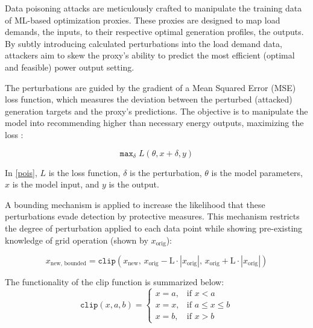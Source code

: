 Data poisoning attacks are meticulously crafted to manipulate the training data of ML-based optimization proxies. These proxies are designed to map load demands, the inputs, to their respective optimal generation profiles, the outputs. By subtly introducing calculated perturbations into the load demand data, attackers aim to skew the proxy's ability to predict the most efficient (optimal and feasible) power output setting.

The perturbations are guided by the gradient of a Mean Squared Error (MSE) loss function, which measures the deviation between the perturbed (attacked) generation targets and the proxy's predictions. The objective is to manipulate the model into recommending higher than necessary energy outputs, maximizing the loss \cite{bai2021recent}:

\small
\begin{equation}
\texttt{max}_\delta \; L(\theta, x + \delta, y)\label{pois}
\end{equation}
\normalsize

In \eqref{pois}, $L$ is the loss function, $\delta$ is the perturbation, $\theta$ is the model parameters, $x$ is the model input, and $y$ is the output.

A bounding mechanism is applied to increase the likelihood that these perturbations evade detection by protective measures. This mechanism restricts the degree of perturbation applied to each data point while showing {\color{black}pre-existing knowledge of
grid operation (shown by $x_{\text{orig}}$)}:


\vspace{-.4cm}

\small
\begin{equation}
x_{\text{new, bounded}} = \texttt{clip}\left(x_{\text{new}}, \, x_{\text{orig}} - \text{L} \cdot |x_{\text{orig}}|, \, x_{\text{orig}} + \text{L} \cdot |x_{\text{orig}}|\right) \label{clip}
\end{equation}
\normalsize

\vspace{.2cm}

The functionality of the clip function is summarized below:
\small
\begin{equation}
\texttt{clip}(x, a, b) = 
\begin{cases}
x = a, & \text{if } x < a \\
x = x, & \text{if } a \leq x \leq b \\
x = b, & \text{if } x > b
\end{cases}
\end{equation}
\normalsize

